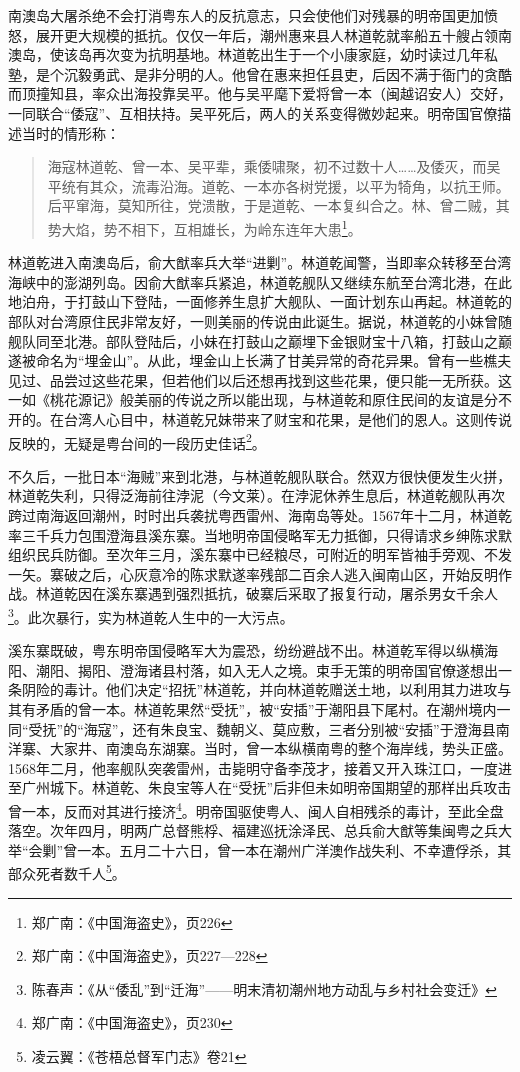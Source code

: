 南澳岛大屠杀绝不会打消粤东人的反抗意志，只会使他们对残暴的明帝国更加愤怒，展开更大规模的抵抗。仅仅一年后，潮州惠来县人林道乾就率船五十艘占领南澳岛，使该岛再次变为抗明基地。林道乾出生于一个小康家庭，幼时读过几年私塾，是个沉毅勇武、是非分明的人。他曾在惠来担任县吏，后因不满于衙门的贪酷而顶撞知县，率众出海投靠吴平。他与吴平麾下爱将曾一本（闽越诏安人）交好，一同联合“倭寇”、互相扶持。吴平死后，两人的关系变得微妙起来。明帝国官僚描述当时的情形称：

\begin{quote}

海寇林道乾、曾一本、吴平辈，乘倭啸聚，初不过数十人……及倭灭，而吴平统有其众，流毒沿海。道乾、一本亦各树党援，以平为犄角，以抗王师。后平窜海，莫知所往，党溃散，于是道乾、一本复纠合之。林、曾二贼，其势大焰，势不相下，互相雄长，为岭东连年大患\footnote{郑广南：《中国海盗史》，页226}。

\end{quote}

林道乾进入南澳岛后，俞大猷率兵大举“进剿”。林道乾闻警，当即率众转移至台湾海峡中的澎湖列岛。因俞大猷率兵紧追，林道乾舰队又继续东航至台湾北港，在此地泊舟，于打鼓山下登陆，一面修养生息扩大舰队、一面计划东山再起。林道乾的部队对台湾原住民非常友好，一则美丽的传说由此诞生。据说，林道乾的小妹曾随舰队同至北港。部队登陆后，小妹在打鼓山之巅埋下金银财宝十八箱，打鼓山之巅遂被命名为“埋金山”。从此，埋金山上长满了甘美异常的奇花异果。曾有一些樵夫见过、品尝过这些花果，但若他们以后还想再找到这些花果，便只能一无所获。这一如《桃花源记》般美丽的传说之所以能出现，与林道乾和原住民间的友谊是分不开的。在台湾人心目中，林道乾兄妹带来了财宝和花果，是他们的恩人。这则传说反映的，无疑是粤台间的一段历史佳话\footnote{郑广南：《中国海盗史》，页227—228}。

不久后，一批日本“海贼”来到北港，与林道乾舰队联合。然双方很快便发生火拼，林道乾失利，只得泛海前往浡泥（今文莱）。在浡泥休养生息后，林道乾舰队再次跨过南海返回潮州，时时出兵袭扰粤西雷州、海南岛等处。1567年十二月，林道乾率三千兵力包围澄海县溪东寨。当地明帝国侵略军无力抵御，只得请求乡绅陈求默组织民兵防御。至次年三月，溪东寨中已经粮尽，可附近的明军皆袖手旁观、不发一矢。寨破之后，心灰意冷的陈求默遂率残部二百余人逃入闽南山区，开始反明作战。林道乾因在溪东寨遇到强烈抵抗，破寨后采取了报复行动，屠杀男女千余人\footnote{陈春声：《从“倭乱”到“迁海”——明末清初潮州地方动乱与乡村社会变迁》}。此次暴行，实为林道乾人生中的一大污点。

溪东寨既破，粤东明帝国侵略军大为震恐，纷纷避战不出。林道乾军得以纵横海阳、潮阳、揭阳、澄海诸县村落，如入无人之境。束手无策的明帝国官僚遂想出一条阴险的毒计。他们决定“招抚”林道乾，并向林道乾赠送土地，以利用其力进攻与其有矛盾的曾一本。林道乾果然“受抚”，被“安插”于潮阳县下尾村。在潮州境内一同“受抚”的“海寇”，还有朱良宝、魏朝义、莫应敷，三者分别被“安插”于澄海县南洋寨、大家井、南澳岛东湖寨。当时，曾一本纵横南粤的整个海岸线，势头正盛。1568年二月，他率舰队突袭雷州，击毙明守备李茂才，接着又开入珠江口，一度进至广州城下。林道乾、朱良宝等人在“受抚”后非但未如明帝国期望的那样出兵攻击曾一本，反而对其进行接济\footnote{郑广南：《中国海盗史》，页230}。明帝国驱使粤人、闽人自相残杀的毒计，至此全盘落空。次年四月，明两广总督熊桴、福建巡抚涂泽民、总兵俞大猷等集闽粤之兵大举“会剿”曾一本。五月二十六日，曾一本在潮州广洋澳作战失利、不幸遭俘杀，其部众死者数千人\footnote{凌云翼：《苍梧总督军门志》卷21}。

